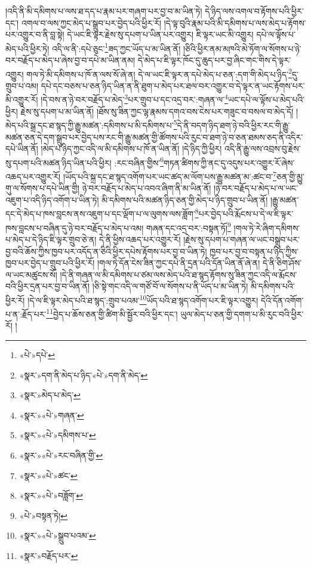 །འདི་ནི་མི་དམིགས་པ་ལས་ཐ་དད་པ་རྣམ་པར་གཞག་པར་བྱ་བ་མ་ཡིན་ཏེ། དེ་ཉིད་ལས་འགལ་བ་རྟོགས་པའི་ཕྱིར་དང་། འགལ་བ་ལས་ཀྱང་མེད་པ་སྒྲུབ་པར་བྱེད་པའི་ཕྱིར་རོ། །དེ་ལྟ་བུའི་རྣམ་པའི་མི་དམིགས་པ་ལས་མེད་པ་རྟོགས་པར་འགྱུར་བ་ནི་བླ་སྟེ། དེ་ཡང་ཇི་ལྟར་རྗེས་སུ་དཔག་པ་ཡིན་པར་འགྱུར། ཇི་ལྟར་ཡང་མི་འགྱུར། དཔེ་ལ་ལྟོས་པ་མེད་པའི་ཕྱིར་ཏེ། འདི་ལ་ནི་:དཔེ་ཅུང་\footnote{«པེ་»དཔེ་}ཟད་ཀྱང་ཡོད་པ་མ་ཡིན་ནོ། །ཅིའི་ཕྱིར་ནམ་མཁའི་མེ་ཏོག་ལ་སོགས་པ་ཉེ་བར་བརྗོད་པ་མེད་པ་ཞེས་བྱ་བ་དཔེ་མ་ཡིན་ནམ། དེ་མེད་པ་ཇི་ལྟར་ཁོང་དུ་ཆུད་པར་བྱ་ཞིང་གང་གིས་དེ་ལྟར་འགྱུར། གལ་ཏེ་མི་དམིགས་པ་ཁོ་ན་ལས་སོ་ཞེ་ན། དེ་ལ་ཡང་ཇི་ལྟར་ན་དཔེ་མེད་པ་ཅན་:དག་གི་མེད་པ་ཉིད་\footnote{«སྣར་»དག་ནི་མེད་པ་ཉིད་«པེ་»དག་ནི་མེད་}དུ་གྲུབ་པ་འམ། དཔེ་དང་བཅས་པ་ཅན་ཉིད་ཡིན་ན་ནི་ཐུག་པ་མེད་པར་ཐལ་བར་འགྱུར་བ་དེ་ལྟར་ན་ཡང་རྟོགས་པར་མི་འགྱུར་རོ། །དེ་བས་ན་ཉེ་བར་བརྗོད་པ་མེད་\footnote{«སྣར་»མེད་པ་མེད་}པར་གྲུབ་པ་དང་འདྲ་བར་:གཞན་ལ་\footnote{«སྣར་»«པེ་»གཞན་}ཡང་དཔེ་ལ་ལྟོས་པ་མེད་པའི་ཕྱིར། རྗེས་སུ་དཔག་པ་མ་ཡིན་ནོ། །ཐོས་སུ་ཟིན་ཀྱང་ལྷ་རྣམས་དགའ་བས་ངེས་པར་གཟུང་བ་བསལ་བ་མེད་དོ། །མེད་པའི་སྒྲ་དང་ཐ་སྙད་ཀྱི་རྒྱུ་མཚན་:དམིགས་པ་མི་དམིགས་པ་\footnote{«སྣར་»«པེ་»དམིགས་པ་}དེ་ནི་བདག་ཉིད་ཐག་ཉེ་བའི་ཕྱིར་རང་གི་རྒྱུ་མཚན་ཅན་དེ་དག་སྒྲུབ་པར་བྱེད་པས་རང་གི་རྒྱུ་མཚན་གྱི་ཚོགས་པའི་རུང་བ་ཐག་ཉེ་བ་ཅན་ཐམས་ཅད་ནི་འདིར་དཔེ་ཡིན་ནོ། །མེད་པ་ཉིད་ཀྱང་འདི་ལ་མི་དམིགས་པ་ཁོ་ན་ཡིན་ནོ། །དེ་ཉིད་ཀྱི་ཕྱིར། འདི་ནི་རྒྱུ་ལས་འབྲས་བུ་རྗེས་སུ་དཔག་པའི་མཚན་ཉིད་ཡིན་པའི་ཕྱིར། :རང་བཞིན་གྱིས་\footnote{«སྣར་»«པེ་»རང་བཞིན་གྱི་}གཏན་ཚིགས་ཀྱི་ནང་དུ་འདུས་པར་འགྱུར་རོ་ཞེས་འཆད་པར་འགྱུར་རོ། །ཡོད་པའི་སྐྲ་དང་ཐ་སྙད་འགོག་པར་ཡང་ཚད་མ་ལོག་པས་རྒྱུ་མཚན་མ་:ཚང་བ་\footnote{«སྣར་»«པེ་»ཚང་}ཅན་གྱི་མྱུ་གུ་ལ་སོགས་པ་དཔེ་ཡིན་གྱི། ཉེ་བར་བརྗོད་པ་མེད་པ་འབའ་ཞིག་ནི་མ་ཡིན་ནོ། །ཉེ་བར་བརྗོད་པ་མེད་པ་ལ་ཡང་འཇུག་པ་འདི་ཉིད་འགོག་པ་ཡིན་ཏེ། མི་དམིགས་པའི་མཚན་ཉིད་ཅན་གྱི་མེད་པ་ཉིད་གྲུབ་པ་ཡིན་ནོ། །རྒྱུ་མཚན་དང་དེ་མེད་པ་ཁས་བླངས་ནས་འཇུག་པ་དང་ལྡོག་པ་ལ་ལུགས་ལས་ཟློག་\footnote{«སྣར་»«པེ་»བཟློག་}པར་བྱེད་པའི་རྨོངས་པ་དེ་ལ་ཇི་ལྟར་ཁས་བླངས་པ་བཞིན་དུ་ཉེ་བར་བརྗོད་པ་མེད་པ་འམ། གཞན་དང་འདྲ་བར་:བསྟན་ཏོ།\footnote{«པེ་»བསྟན་ཏེ།} །གལ་ཏེ་རེ་ཞིག་དམིགས་པ་མེད་པ་དེ་ཉིད་ཇི་ལྟར་གྲུབ་ཅེ་ན། དེ་ནི་ཕྱིས་འཆད་པར་འགྱུར་རོ། །རྗེས་སུ་དཔག་པ་གཞན་ལ་ཡང་བསྒྲུབ་པར་བྱ་བའི་ཆོས་ཀྱིས་ཁྱབ་པར་འདོད་ན་ཅིའི་ཕྱིར་དཔེས་རྟོགས་པར་བྱ་བ་ཡིན་ཏེ། ཁྱབ་པར་བྱ་བ་བསྟན་པ་ཉིད་ཀྱིས་ཁྱབ་པར་བྱེད་པ་གྲུབ་པའི་ཕྱིར་རོ། །གལ་ཏེ་དོན་ངེས་ཟིན་ཀྱང་དཔེ་ནི་དྲན་པའི་དོན་ཡིན་ནོ་ཞེ་ན། དེ་ནི་ཅིག་ཤོས་ལ་ཡང་མཚུངས་སོ། །དེ་ནི་གཞན་ལ་མི་དམིགས་པ་ཙམ་ལས་མེད་པའི་ཐ་སྙད་རྟོགས་སུ་ཟིན་ཀྱང་འདི་ལ་རྨོངས་བའི་ཕྱིར་དྲན་པར་བྱ་བ་ཡིན་ནོ། །ཅི་སྟེ་གང་འདི་ལ་གཙོ་བོ་ལ་སོགས་པ་ནི་ཡོད་པ་མ་ཡིན་ཏེ། མི་དམིགས་པའི་ཕྱིར་རོ། །དེ་ལ་ཇི་ལྟར་མེད་པའི་ཐ་སྙད་:གྲུབ་པའམ་\footnote{«སྣར་»«པེ་»སྒྲུབ་པའམ་}ཡོད་པའི་ཐ་སྙད་འགོག་པར་ཇི་ལྟར་འགྱུར། དེའི་དོན་འགོག་པ་ན་:རྗོད་པར་\footnote{«སྣར་»བརྗོད་པར་}བྱེད་པ་ཆོས་ཅན་གྱི་ཚིག་མི་སྦྱོར་བའི་ཕྱིར་དང་། ཡུལ་མེད་པ་ཅན་གྱི་དགག་པ་མི་རུང་བའི་ཕྱིར་རོ། །
